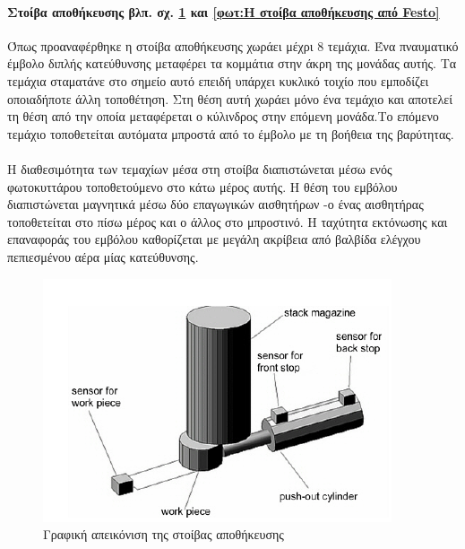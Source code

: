 \documentclass[a4paper,12pt,twoside]{report}
\begin{document}
				
				\paragraph{Στοίβα αποθήκευσης {\footnotesize βλπ. σχ. \ref{φωτ:Η στοίβα αποθήκευσης από Θράμπο} και \ref{φωτ:Η στοίβα αποθήκευσης από Festo}}} {Όπως προαναφέρθηκε η στοίβα αποθήκευσης χωράει μέχρι 8 τεμάχια. Ένα πναυματικό έμβολο διπλής κατεύθυνσης μεταφέρει τα κομμάτια στην άκρη της μονάδας αυτής. Τα τεμάχια σταματάνε στο σημείο αυτό επειδή υπάρχει κυκλικό τοιχίο που εμποδίζει οποιαδήποτε άλλη τοποθέτηση. Στη θέση αυτή χωράει μόνο ένα τεμάχιο και αποτελεί τη θέση από την οποία μεταφέρεται ο κύλινδρος στην επόμενη μονάδα.Το επόμενο τεμάχιο τοποθετείται αυτόματα μπροστά από το έμβολο με τη βοήθεια της βαρύτητας.
				}
				\paragraph{} {Η διαθεσιμότητα των τεμαχίων μέσα στη στοίβα διαπιστώνεται μέσω ενός φωτοκυττάρου τοποθετούμενο στο κάτω μέρος αυτής. Η θέση του εμβόλου διαπιστώνεται μαγνητικά μέσω δύο επαγωγικών αισθητήρων -ο ένας αισθητήρας τοποθετείται στο πίσω μέρος και ο άλλος στο μπροστινό. Η ταχύτητα εκτόνωσης και επαναφοράς του εμβόλου καθορίζεται με μεγάλη ακρίβεια από \gls{βαλβίδα ελέγχου πεπιεσμένου αέρα μίας κατεύθυνσης}.
				}

				\begin{figure}[hp]
					\centering
					\includegraphics[scale=0.7]{StackModulePartsThrambo.png}
					\caption{Γραφική απεικόνιση της στοίβας αποθήκευσης \cite{ΤοΦυσικόΣύστημαFestoMPS}}
					\label{φωτ:Η στοίβα αποθήκευσης από Θράμπο}
				\end{figure}
	
\end{document}
